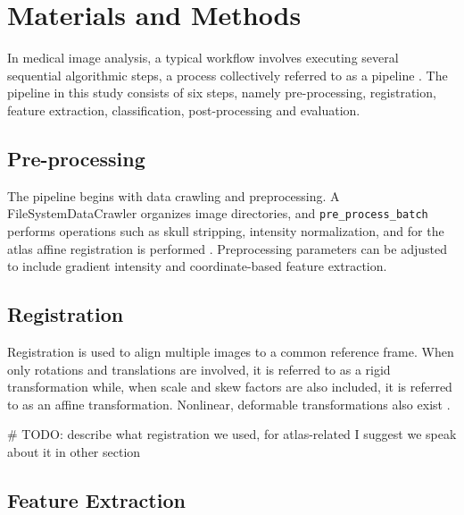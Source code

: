 \section{Materials and Methods}

In medical image analysis, a typical workflow involves executing several sequential algorithmic steps, a process collectively referred to as a pipeline \cite{b8}. The pipeline in this study consists of six steps, namely pre-processing, registration, feature extraction, classification, post-processing and evaluation.

\subsection{Pre-processing}
The pipeline begins with data crawling and preprocessing. A FileSystemDataCrawler organizes image directories, and \texttt{pre\_process\_batch} performs operations such as skull stripping, intensity normalization, and for the atlas affine registration is performed  \cite{b9}. Preprocessing parameters can be adjusted to include gradient intensity and coordinate-based feature extraction.

\subsection{Registration}

Registration is used to align multiple images to a common reference frame. When only rotations and translations are involved, it is referred to as a rigid transformation while, when scale and skew factors are also included, it is referred to as an affine transformation. Nonlinear, deformable transformations also exist \cite{b10}.

\# TODO: describe what registration we used, for atlas-related I suggest we speak about it in other section

\subsection{Feature Extraction}

